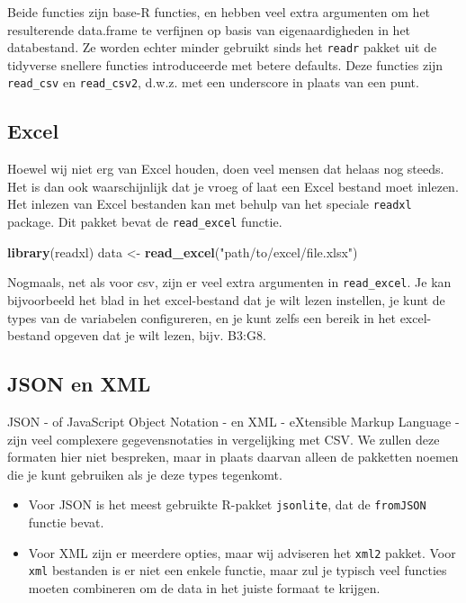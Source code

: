 \documentclass[]{tufte-book}
\newenvironment{Shaded}{}{}
\newcommand{\KeywordTok}[1]{\textcolor[rgb]{0.00,0.44,0.13}{\textbf{#1}}}
\newcommand{\NormalTok}[1]{#1}
\newcommand{\StringTok}[1]{\textcolor[rgb]{0.25,0.44,0.63}{#1}}
\providecommand{\tightlist}{%
  \setlength{\itemsep}{0pt}\setlength{\parskip}{0pt}}
\begin{document}
Beide functies zijn base-R functies, en hebben veel extra argumenten om het resulterende data.frame te verfijnen op basis van eigenaardigheden in het databestand. Ze worden echter minder gebruikt sinds het \texttt{readr} pakket uit de tidyverse snellere functies introduceerde met betere defaults. Deze functies zijn \texttt{read\_csv} en \texttt{read\_csv2}, d.w.z. met een underscore in plaats van een punt.

\hypertarget{excel}{%
\subsection{Excel}\label{excel}}

Hoewel wij niet erg van Excel houden, doen veel mensen dat helaas nog steeds. Het is dan ook waarschijnlijk dat je vroeg of laat een Excel bestand moet inlezen. Het inlezen van Excel bestanden kan met behulp van het speciale \texttt{readxl} package. Dit pakket bevat de \texttt{read\_excel} functie.

\begin{Shaded}
\begin{Highlighting}[]
\KeywordTok{library}\NormalTok{(readxl)}
\NormalTok{data <-}\StringTok{ }\KeywordTok{read_excel}\NormalTok{(}\StringTok{"path/to/excel/file.xlsx"}\NormalTok{)}
\end{Highlighting}
\end{Shaded}

Nogmaals, net als voor csv, zijn er veel extra argumenten in \texttt{read\_excel}. Je kan bijvoorbeeld het blad in het excel-bestand dat je wilt lezen instellen, je kunt de types van de variabelen configureren, en je kunt zelfs een bereik in het excel-bestand opgeven dat je wilt lezen, bijv. B3:G8.

\hypertarget{json-en-xml}{%
\subsection{JSON en XML}\label{json-en-xml}}

JSON - of JavaScript Object Notation - en XML - eXtensible Markup Language - zijn veel complexere gegevensnotaties in vergelijking met CSV. We zullen deze formaten hier niet bespreken, maar in plaats daarvan alleen de pakketten noemen die je kunt gebruiken als je deze types tegenkomt.

\begin{itemize}
\tightlist
\item
  Voor JSON is het meest gebruikte R-pakket \texttt{jsonlite}, dat de \texttt{fromJSON} functie bevat.
\item
  Voor XML zijn er meerdere opties, maar wij adviseren het \texttt{xml2} pakket. Voor \texttt{xml} bestanden is er niet een enkele functie, maar zul je typisch veel functies moeten combineren om de data in het juiste formaat te krijgen.
\end{itemize}
\end{document}
